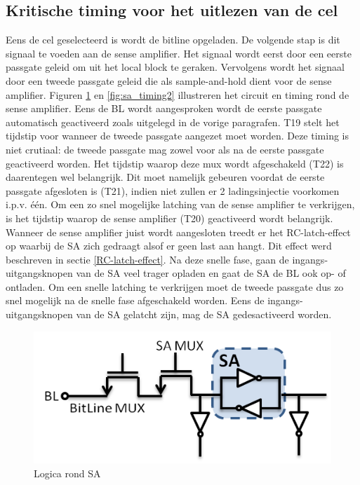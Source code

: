 \subsection{Kritische timing voor het uitlezen van de cel}
Eens de cel geselecteerd is wordt de bitline opgeladen. De volgende stap is dit signaal te voeden aan de sense amplifier. Het signaal wordt eerst door een eerste passgate geleid om uit het local block te geraken. Vervolgens wordt het signaal door een tweede passgate geleid die als sample-and-hold dient voor de sense amplifier. Figuren \ref{fig:sa_timing1} en \ref{fig:sa_timing2} illustreren het circuit en timing rond de sense amplifier. Eens de BL wordt aangesproken wordt de eerste passgate automatisch geactiveerd zoals uitgelegd in de vorige paragrafen. T19 stelt het tijdstip voor wanneer de tweede passgate aangezet moet worden. Deze timing is niet crutiaal: de tweede passgate mag zowel voor als na de eerste passgate geactiveerd worden. Het tijdstip waarop deze mux wordt afgeschakeld (T22) is daarentegen wel belangrijk. Dit moet namelijk gebeuren voordat de eerste passgate afgesloten is (T21), indien niet zullen er 2 ladingsinjectie voorkomen i.p.v. één. Om een zo snel mogelijke latching van de sense amplifier te verkrijgen, is het tijdstip waarop de sense amplifier (T20) geactiveerd wordt belangrijk. Wanneer de sense amplifier juist wordt aangesloten treedt er het RC-latch-effect op waarbij de SA zich gedraagt alsof er geen last aan hangt. Dit effect werd beschreven in sectie \ref{RC-latch-effect}. Na deze snelle fase, gaan de ingangs-uitgangsknopen van de SA veel trager opladen en gaat de SA de BL ook op- of ontladen. Om een snelle latching te verkrijgen moet de tweede passgate dus zo snel mogelijk na de snelle fase afgeschakeld worden. Eens de ingangs-uitgangsknopen van de SA gelatcht zijn, mag de SA gedesactiveerd worden.

\begin{figure}[!ht]
  \centering
  \includegraphics[scale=0.6]{../fig/hfdstk-timing-sa1.png}
  \caption[SA:logica]{Logica rond SA}
  \label{fig:sa_timing1}
\end{figure}

